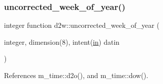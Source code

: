 \mbox{\label{M__time_8f90_a4a68c5e906616f64da0c3d165fc41479}} 
\subsubsection{\texorpdfstring{uncorrected\+\_\+week\+\_\+of\+\_\+year()}{uncorrected\_week\_of\_year()}}
{\footnotesize\ttfamily integer function d2w\+::uncorrected\+\_\+week\+\_\+of\+\_\+year (\begin{DoxyParamCaption}\item[{integer, dimension(8), intent(\hyperlink{M__journal_83_8txt_afce72651d1eed785a2132bee863b2f38}{in})}]{datin }\end{DoxyParamCaption})\hspace{0.3cm}{\ttfamily [private]}}



References m\+\_\+time\+::d2o(), and m\+\_\+time\+::dow().

